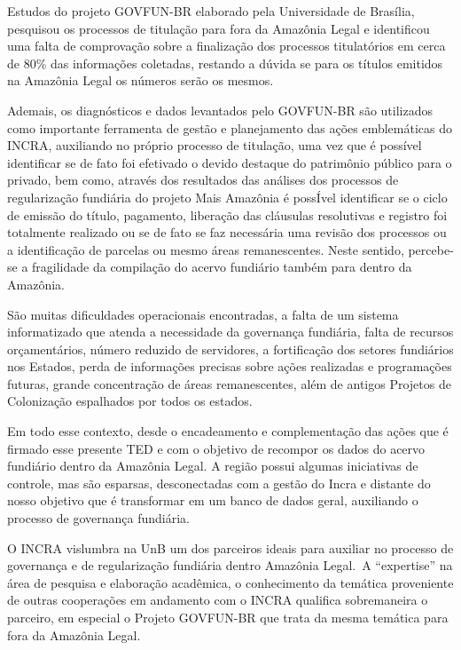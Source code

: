 \documentclass[
  letterpaper,
]{report}
\begin{document}
Estudos do projeto GOVFUN-BR elaborado pela Universidade de Brasília,
pesquisou os processos de titulação para fora da Amazônia Legal e
identificou uma falta de comprovação sobre a finalização dos processos
titulatórios em cerca de 80\% das informações coletadas, restando a
dúvida se para os títulos emitidos na Amazônia Legal os números serão os
mesmos.~

Ademais, os diagnósticos e dados levantados pelo GOVFUN-BR são
utilizados como importante ferramenta de gestão e planejamento das ações
emblemáticas do INCRA, auxiliando no próprio processo de titulação, uma
vez que é possível identificar se de fato foi efetivado o devido
destaque do patrimônio público para o privado, bem como, através dos
resultados das análises dos processos de regularização fundiária do
projeto Mais Amazônia é possÍvel identificar se o ciclo de emissão do
título, pagamento, liberação das cláusulas resolutivas e registro foi
totalmente realizado ou se de fato se faz necessária uma revisão dos
processos ou a identificação de parcelas ou mesmo áreas remanescentes.
Neste sentido, percebe-se a fragilidade da compilação do acervo
fundiário também para dentro da Amazônia.~~

São muitas dificuldades operacionais encontradas, a falta de um sistema
informatizado que atenda a necessidade da governança fundiária, falta de
recursos orçamentários, número reduzido de servidores, a fortificação
dos setores fundiários nos Estados, perda de informações precisas sobre
ações realizadas e programações futuras, grande concentração de áreas
remanescentes, além de antigos Projetos de Colonização espalhados por
todos os estados.~

Em todo esse contexto, desde o encadeamento e complementação das ações
que é firmado esse presente TED e com o objetivo de recompor os dados do
acervo fundiário dentro da Amazônia Legal. A região possui algumas
iniciativas de controle, mas são esparsas, desconectadas com a gestão do
Incra e distante do nosso objetivo que é transformar em um banco de
dados geral, auxiliando o processo de governança fundiária.~

O INCRA vislumbra na UnB um dos parceiros ideais para auxiliar no
processo de governança e de regularização fundiária dentro Amazônia
Legal.\, A ``expertise'' na área de pesquisa e elaboração acadêmica, o
conhecimento da temática proveniente de outras cooperações em andamento
com o INCRA qualifica sobremaneira o parceiro, em especial o Projeto
GOVFUN-BR que trata da mesma temática para fora da Amazônia Legal.~
\end{document}
